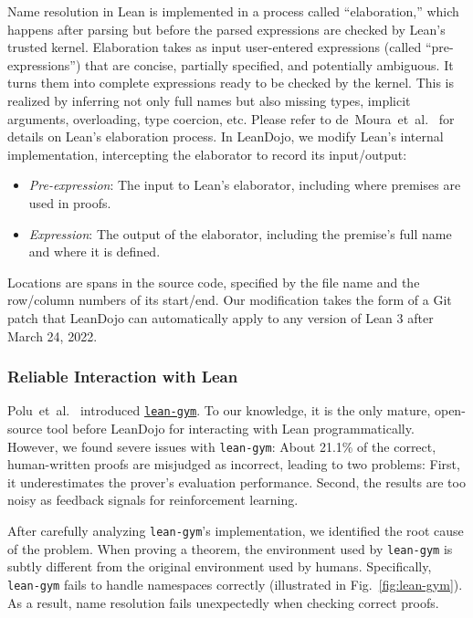 Name resolution in Lean is implemented in a process called ``elaboration,'' which happens after parsing but before the parsed expressions are checked by Lean's trusted kernel. Elaboration takes as input user-entered expressions (called ``pre-expressions'') that are concise, partially specified, and potentially ambiguous. It turns them into complete expressions ready to be checked by the kernel. This is realized by inferring not only full names but also missing types, implicit arguments, overloading, type coercion, etc. Please refer to de~Moura~et~al.~\cite{de2015elaboration} for details on Lean's elaboration process. In LeanDojo, we modify Lean's internal implementation, intercepting the elaborator to record its input/output:
\begin{itemize}
\item \emph{Pre-expression}: The input to Lean's elaborator, including where premises are used in proofs.
\item \emph{Expression}: The output of the elaborator, including the premise's full name and where it is defined.
\end{itemize}
Locations are spans in the source code, specified by the file name and the row/column numbers of its start/end. Our modification takes the form of a Git patch that LeanDojo can automatically apply to any version of Lean 3 after March 24, 2022.


\subsubsection{Reliable Interaction with Lean}
\label{appendix:leandojo:interaction}

Polu~et~al.~\cite{polu2023formal} introduced 
\href{https://github.com/openai/lean-gym}{\texttt{lean-gym}}. To our knowledge, it is the only mature, open-source tool before LeanDojo for interacting with Lean programmatically. However, we found severe issues with \texttt{lean-gym}: About 21.1\% of the correct, human-written proofs are misjudged as incorrect, leading to two problems: First, it underestimates the prover's evaluation performance. Second, the results are too noisy as feedback signals for reinforcement learning.

After carefully analyzing \texttt{lean-gym}'s implementation, we identified the root cause of the problem. When proving a theorem, the environment used by \texttt{lean-gym} is subtly different from the original environment used by humans. Specifically, \texttt{lean-gym} fails to handle namespaces correctly (illustrated in Fig.~\ref{fig:lean-gym}). As a result, name resolution fails unexpectedly when checking correct proofs.

